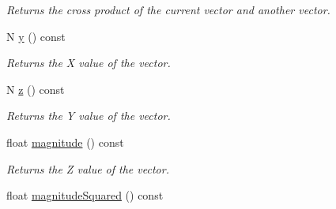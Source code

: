 \begin{DoxyCompactItemize}
\begin{DoxyCompactList}\small\item\em Returns the cross product of the current vector and another vector. \end{DoxyCompactList}\item 
\hypertarget{class_vector3_d_a9d39ee3db89b1c7ea24aaff57094e697}{N \hyperlink{class_vector3_d_a9d39ee3db89b1c7ea24aaff57094e697}{y} () const }\label{class_vector3_d_a9d39ee3db89b1c7ea24aaff57094e697}

\begin{DoxyCompactList}\small\item\em Returns the X value of the vector. \end{DoxyCompactList}\item 
\hypertarget{class_vector3_d_aa3ea7b43e9b16edf9741bdbc29e1b209}{N \hyperlink{class_vector3_d_aa3ea7b43e9b16edf9741bdbc29e1b209}{z} () const }\label{class_vector3_d_aa3ea7b43e9b16edf9741bdbc29e1b209}

\begin{DoxyCompactList}\small\item\em Returns the Y value of the vector. \end{DoxyCompactList}\item 
\hypertarget{class_vector3_d_a223032e8f17627ee4bbf43f5354f2def}{float \hyperlink{class_vector3_d_a223032e8f17627ee4bbf43f5354f2def}{magnitude} () const }\label{class_vector3_d_a223032e8f17627ee4bbf43f5354f2def}

\begin{DoxyCompactList}\small\item\em Returns the Z value of the vector. \end{DoxyCompactList}\item 
\hypertarget{class_vector3_d_a62d130ec8cf7d9a19cdd66bb111bc397}{float \hyperlink{class_vector3_d_a62d130ec8cf7d9a19cdd66bb111bc397}{magnitude\+Squared} () const }\label{class_vector3_d_a62d130ec8cf7d9a19cdd66bb111bc397}


\end{DoxyCompactItemize}
